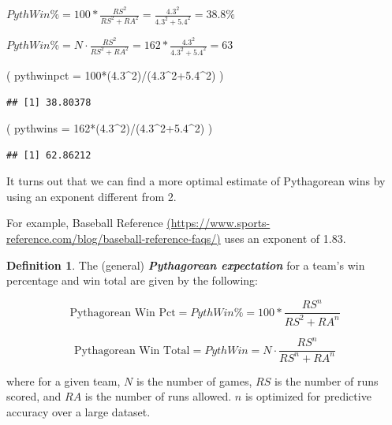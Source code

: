 \documentclass[
  11pt,
]{book}
\newenvironment{Shaded}{\begin{snugshade}}{\end{snugshade}}
\newcommand{\AttributeTok}[1]{\textcolor[rgb]{0.77,0.63,0.00}{#1}}
\newcommand{\DecValTok}[1]{\textcolor[rgb]{0.00,0.00,0.81}{#1}}
\newcommand{\FloatTok}[1]{\textcolor[rgb]{0.00,0.00,0.81}{#1}}
\newcommand{\NormalTok}[1]{#1}
\newcommand{\SpecialCharTok}[1]{\textcolor[rgb]{0.00,0.00,0.00}{#1}}
\theoremstyle{definition}
\newtheorem{definition}{Definition}[chapter]
\theoremstyle{definition}
\theoremstyle{definition}
\theoremstyle{definition}
\theoremstyle{remark}
\begin{document}
\(PythWin\% = 100 * \frac{RS^2}{RS^2+RA^2} = \frac{4.3^2}{4.3^2+5.4^2} = 38.8\%\)

\(PythWin\% = N \cdot \frac{RS^2}{RS^2+RA^2} = 162 * \frac{4.3^2}{4.3^2+5.4^2} = 63\)

\begin{Shaded}
\begin{Highlighting}[]
\NormalTok{( }\AttributeTok{pythwinpct =} \DecValTok{100}\SpecialCharTok{*}\NormalTok{(}\FloatTok{4.3}\SpecialCharTok{\^{}}\DecValTok{2}\NormalTok{)}\SpecialCharTok{/}\NormalTok{(}\FloatTok{4.3}\SpecialCharTok{\^{}}\DecValTok{2}\FloatTok{+5.4}\SpecialCharTok{\^{}}\DecValTok{2}\NormalTok{) )}
\end{Highlighting}
\end{Shaded}

\begin{verbatim}
## [1] 38.80378
\end{verbatim}

\begin{Shaded}
\begin{Highlighting}[]
\NormalTok{( }\AttributeTok{pythwins =} \DecValTok{162}\SpecialCharTok{*}\NormalTok{(}\FloatTok{4.3}\SpecialCharTok{\^{}}\DecValTok{2}\NormalTok{)}\SpecialCharTok{/}\NormalTok{(}\FloatTok{4.3}\SpecialCharTok{\^{}}\DecValTok{2}\FloatTok{+5.4}\SpecialCharTok{\^{}}\DecValTok{2}\NormalTok{) )}
\end{Highlighting}
\end{Shaded}

\begin{verbatim}
## [1] 62.86212
\end{verbatim}

\newpage

It turns out that we can find a more optimal estimate of Pythagorean wins by using an exponent different from 2.

For example, Baseball Reference \href{https://www.sports-reference.com/blog/baseball-reference-faqs/}{(https://www.sports-reference.com/blog/baseball-reference-faqs/)} uses an exponent of 1.83.

\begin{definition}
The (general) \textbf{\emph{Pythagorean expectation}} for a team's win percentage and win total are given by the following:

\[\text{Pythagorean Win Pct} = PythWin\% = 100 * \frac{RS^n}{RS^2 + RA^n}\]

\[\text{Pythagorean Win Total} = PythWin = N \cdot \frac{RS^n}{RS^n + RA^n}\]

where for a given team, \(N\) is the number of games, \(RS\) is the number of runs scored, and \(RA\) is the number of runs allowed. \(n\) is optimized for predictive accuracy over a large dataset.
\end{definition}
\end{document}
